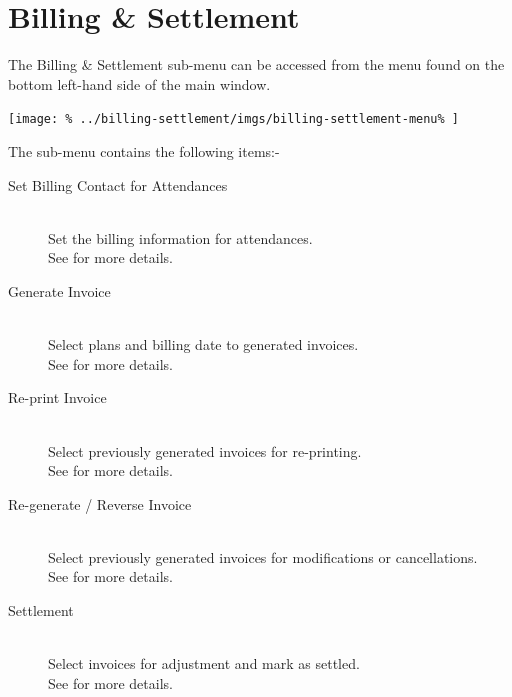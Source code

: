 \documentclass[../main/main]{subfiles}
\begin{document}
\newpage
\chapter{Billing \& Settlement}
The Billing \& Settlement sub-menu can be accessed from the menu found
on the bottom left-hand side of the main window.

\texttt{[image: \%
  ../billing-settlement/imgs/billing-settlement-menu\%
]}

The sub-menu contains the following items:-
\begin{description}
\item[Set Billing Contact for Attendances] \hfill \\
Set the billing information for attendances.\\
See  for more details.\\
\item[Generate Invoice] \hfill \\
Select plans and billing date to generated invoices.\\
See  for more details.
\item[Re-print Invoice] \hfill \\
Select previously generated invoices for re-printing.\\
See  for more details.
\item[Re-generate / Reverse Invoice] \hfill \\
Select previously generated invoices for modifications or cancellations.\\
See  for more details.
\item[Settlement] \hfill \\
Select invoices for adjustment and mark as settled.\\
See  for more details.
\end{description}






\end{document}

